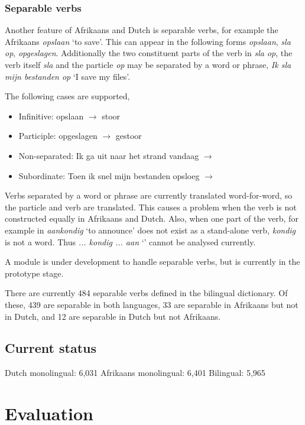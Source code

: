 \documentclass[11pt]{article}
\begin{document}
\subsubsection{Separable verbs}

Another feature of Afrikaans and Dutch is separable verbs, for example
the Afrikaans {\em opslaan} `to save'. This can appear in the following
forms {\em opslaan}, {\em sla op}, {\em opgeslagen}. Additionally the two constituent
parts of the verb in {\em sla op}, the verb itself {\em sla} and the particle
{\em op} may be separated by a word or phrase, {\em Ik sla mijn bestanden op}
 `I save my files'.

The following cases are supported,

\begin{itemize}
\item Infinitive: opslaan $\rightarrow$ stoor 
\item Participle: opgeslagen $\rightarrow$ gestoor
\item Non-separated: Ik ga uit naar het strand vandaag $\rightarrow$
\item Subordinate: Toen ik snel mijn bestanden opsloeg $\rightarrow$ 
\end{itemize}

Verbs separated by a word or phrase are currently translated word-for-word,
so the particle and verb are translated. This causes a problem when the
verb is not constructed equally in Afrikaans and Dutch. Also, when one part
of the verb, for example in {\em aankondig} `to announce' does not exist as
a stand-alone verb, {\em kondig} is not a word. Thus {\em ... kondig ... aan} `'
cannot be analysed currently.

A module is under development to handle separable verbs, but is currently
in the prototype stage.

There are currently 484 separable verbs defined in the bilingual
dictionary. Of these, 439 are separable in both languages, 33 are
separable in Afrikaans but not in Dutch, and 12 are separable in
Dutch but not Afrikaans.

\subsection{Current status}

Dutch monolingual: 6,031
Afrikaans monolingual: 6,401
Bilingual: 5,965

\section{Evaluation}
\end{document}
